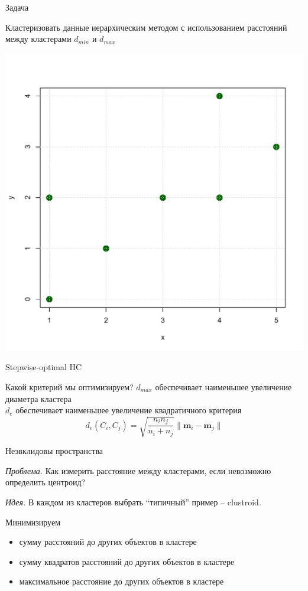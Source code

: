 \documentclass[10pt]{beamer}
\begin{document}
\begin{frame}{Задача}

Кластеризовать данные иерархическим методом с использованием расстояний между кластерами $d_{min}$ и $d_{max}$
\begin{center}
\includegraphics[scale=0.4]{images/problem.pdf}
\end{center}

\end{frame}

\begin{frame}{Stepwise-optimal HC}

Какой критерий мы оптимизируем?
\swo
$d_{max}$ обеспечивает наименьшее увеличение диаметра кластера \\
$d_e$ обеспечивает наименьшее увеличение квадратичного критерия
\[
d_e(C_i, C_j) = \sqrt{\frac{n_i n_j}{n_i + n_j}} \|\mathbf{m}_i -\mathbf{m}_j \|
\]

\end{frame}

\begin{frame}{Неэвклидовы пространства}

{\it Проблема. } Как измерить расстояние между кластерами, если невозможно определить центроид?

\vspace{1em}
{\it Идея. } В каждом из кластеров выбрать ``типичный'' пример -- clustroid.

\vspace{1em}
Минимизируем
\begin{itemize}
\item сумму расстояний до других объектов в кластере
\item сумму квадратов расстояний до других объектов в кластере
\item максимальное расстояние до других объектов в кластере
\end{itemize}

\end{frame}
\end{document}
